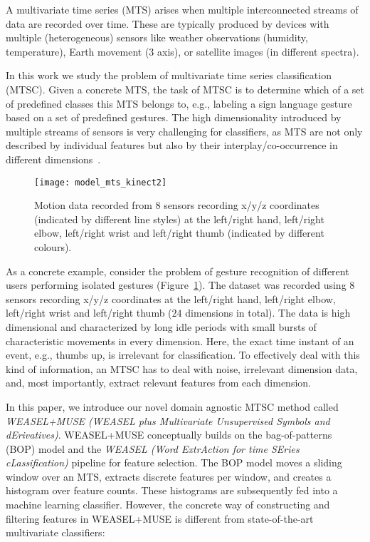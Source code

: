 \documentclass[sigconf]{acmart}
\begin{document}
A multivariate time series (MTS) arises when multiple interconnected streams of data are recorded over time. These are typically produced by devices with multiple (heterogeneous) sensors like weather observations (humidity, temperature), Earth movement (3 axis), or satellite images (in different spectra).

In this work we study the problem of multivariate time series classification (MTSC).  Given a concrete MTS, the task of MTSC is to determine which of a set of predefined classes this MTS belongs to, e.g., labeling a sign language gesture based on a set of predefined gestures. The high dimensionality introduced by multiple streams of sensors is very challenging for classifiers, as MTS are not only described by individual features but also by their interplay/co-occurrence in different dimensions~\cite{baydogan2015learning}.

\begin{figure}
	\begin{centering}
		\texttt{[image: model\_mts\_kinect2]}
		\par\end{centering}
	\caption{Motion data recorded from $8$ sensors recording x/y/z coordinates (indicated by different line styles) at the left/right hand, left/right elbow, left/right wrist and left/right thumb (indicated by different colours).\label{fig:model_mts_kinect}}
\end{figure}

As a concrete example, consider the problem of gesture recognition of different users performing isolated gestures (Figure~\ref{fig:model_mts_kinect}). The dataset was recorded using $8$ sensors recording x/y/z coordinates at the left/right hand, left/right elbow, left/right wrist and left/right thumb ($24$ dimensions in total). The data is high dimensional and characterized by long idle periods with small bursts of characteristic movements in every dimension. Here, the exact time instant of an event, e.g., thumbs up, is irrelevant for classification. To effectively deal with this kind of information, an MTSC has to deal with noise, irrelevant dimension data, and, most importantly, extract relevant features from each dimension.

In this paper, we introduce our novel domain agnostic MTSC method called \emph{WEASEL+MUSE (WEASEL plus Multivariate Unsupervised Symbols and dErivatives)}. WEASEL+MUSE conceptually builds on the bag-of-patterns (BOP) model and the \emph{WEASEL (Word ExtrAction for time SEries cLassification)} pipeline for feature selection. The BOP model moves a sliding window over an MTS, extracts discrete features per window, and creates a histogram over feature counts. These histograms are subsequently fed into a machine learning classifier. However, the concrete way of constructing and filtering features in WEASEL+MUSE is different from state-of-the-art multivariate classifiers:
\end{document}
